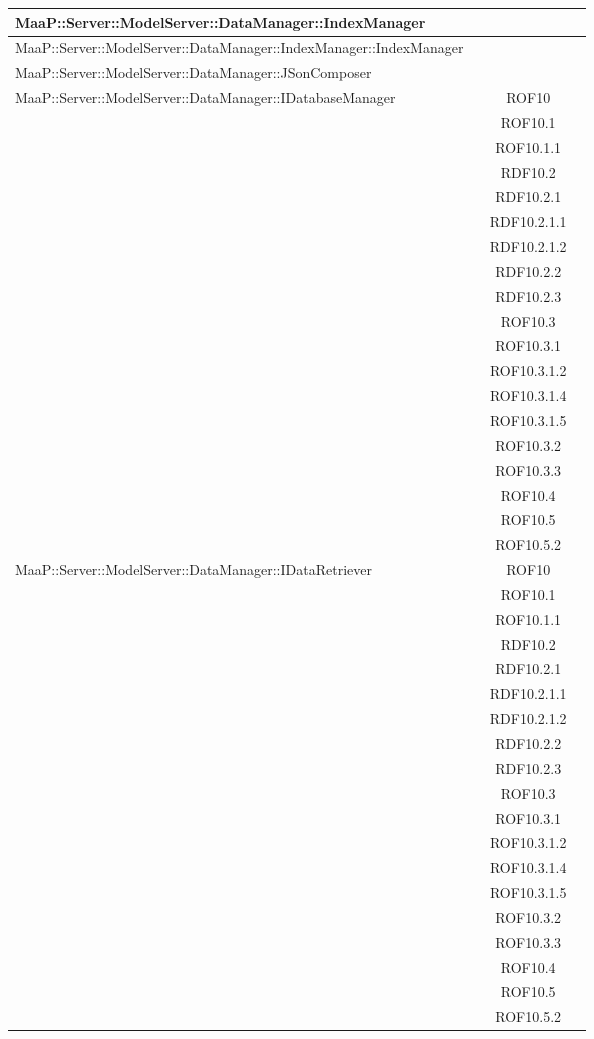 \begin{center}
\begin{longtable}{|p{0.8\linewidth}|c|}
\midrule 
MaaP::Server::ModelServer::DataManager::IndexManager
& \\

\midrule 
MaaP::Server::ModelServer::DataManager::IndexManager::IndexManager
& \\

\midrule 
MaaP::Server::ModelServer::DataManager::JSonComposer
& \\

\midrule 
MaaP::Server::ModelServer::DataManager::IDatabaseManager
& ROF10\\
& ROF10.1\\
& ROF10.1.1\\
& RDF10.2\\
& RDF10.2.1\\
& RDF10.2.1.1\\
& RDF10.2.1.2\\
& RDF10.2.2\\
& RDF10.2.3\\
& ROF10.3\\
& ROF10.3.1\\
& ROF10.3.1.2\\
& ROF10.3.1.4\\
& ROF10.3.1.5\\
& ROF10.3.2\\
& ROF10.3.3\\
& ROF10.4\\
& ROF10.5\\
& ROF10.5.2\\


\midrule 
MaaP::Server::ModelServer::DataManager::IDataRetriever
& ROF10\\
& ROF10.1\\
& ROF10.1.1\\
& RDF10.2\\
& RDF10.2.1\\
& RDF10.2.1.1\\
& RDF10.2.1.2\\
& RDF10.2.2\\
& RDF10.2.3\\
& ROF10.3\\
& ROF10.3.1\\
& ROF10.3.1.2\\
& ROF10.3.1.4\\
& ROF10.3.1.5\\
& ROF10.3.2\\
& ROF10.3.3\\
& ROF10.4\\
& ROF10.5\\
& ROF10.5.2\\



\end{longtable}
\end{center}
